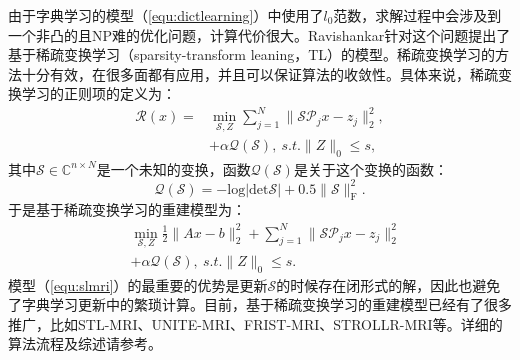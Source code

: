 由于字典学习的模型（\ref{equ:dictlearning}）中使用了$l_0$范数，求解过程中会涉及到一个非凸的且NP难的优化问题\cite{bruckstein2009sparse}，计算代价很大。Ravishankar针对这个问题提出了基于稀疏变换学习（sparsity-transform leaning，TL）的模型\cite{ravishankar2015efficient}。稀疏变换学习的方法十分有效，在很多面都有应用，并且可以保证算法的收敛性。具体来说，稀疏变换学习的正则项的定义为：
\begin{equation}
	\begin{aligned}
		\mathcal{R}(x)=&\min_{\mathcal{S},Z}\sum_{j=1}^N\|\mathcal{S}\mathcal{P}_jx-z_j\|^2_2,\\
		&+\alpha\mathcal{Q}(\mathcal{S}),\ s.t.\|Z\|_0\leq s, 
	\end{aligned}
\end{equation}
其中$\mathcal{S}\in \mathbb{C}^{n\times N}$是一个未知的变换，函数$\mathcal{Q}(\mathcal{S})$是关于这个变换的函数：
\begin{equation}
	\mathcal{Q}(\mathcal{S})=-\mathrm{log}|\mathrm{det}\mathcal{S}|+0.5\|\mathcal{S}\|^2_\mathrm{F}.
\end{equation}
于是基于稀疏变换学习的重建模型为：
\begin{equation}
	\begin{aligned}
		&\min_{\mathcal{S},Z}\frac{1}{2}\|Ax-b\|^2_2+\sum_{j=1}^N\|\mathcal{S}\mathcal{P}_jx-z_j\|^2_2\\
		&+\alpha\mathcal{Q}(\mathcal{S}),\ s.t.\|Z\|_0\leq s.
	\end{aligned}
	\label{equ:slmri}
\end{equation}
模型（\ref{equ:slmri}）的最重要的优势是更新$\mathcal{S}$的时候存在闭形式的解，因此也避免了字典学习更新中的繁琐计算。目前，基于稀疏变换学习的重建模型已经有了很多推广，比如STL-MRI\cite{ravishankar2015efficient}、UNITE-MRI\cite{ravishankar2016data}、FRIST-MRI\cite{wen2017frist}、STROLLR-MRI\cite{wen2018power}等。详细的算法流程及综述请参考\cite{wen2019transform}。

